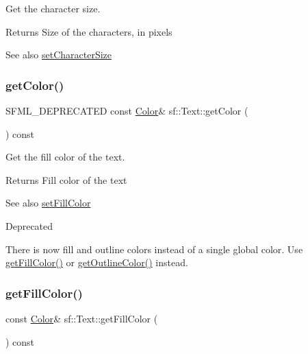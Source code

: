 Get the character size. 

\begin{DoxyReturn}{Returns}
Size of the characters, in pixels
\end{DoxyReturn}
\begin{DoxySeeAlso}{See also}
\hyperlink{classsf_1_1_text_ae96f835fc1bff858f8a23c5b01eaaf7e}{set\+Character\+Size} 
\end{DoxySeeAlso}
\mbox{\label{classsf_1_1_text_a77ba664285efd72ab4ce85b9cbbeeb21}} 
\subsubsection{\texorpdfstring{get\+Color()}{getColor()}}
{\footnotesize\ttfamily S\+F\+M\+L\+\_\+\+D\+E\+P\+R\+E\+C\+A\+T\+ED const \hyperlink{classsf_1_1_color}{Color}\& sf\+::\+Text\+::get\+Color (\begin{DoxyParamCaption}{ }\end{DoxyParamCaption}) const}



Get the fill color of the text. 

\begin{DoxyReturn}{Returns}
Fill color of the text
\end{DoxyReturn}
\begin{DoxySeeAlso}{See also}
\hyperlink{classsf_1_1_text_ab7bb3babac5a6da1802b2c3e1a3e6dcc}{set\+Fill\+Color}
\end{DoxySeeAlso}
\begin{DoxyRefDesc}{Deprecated}
\item[\hyperlink{deprecated__deprecated000016}{Deprecated}]There is now fill and outline colors instead of a single global color. Use \hyperlink{classsf_1_1_text_a6b4ba8c435b59e1e05f831e6230dc537}{get\+Fill\+Color()} or \hyperlink{classsf_1_1_text_a53559d563461089f1172571b375442dc}{get\+Outline\+Color()} instead.\end{DoxyRefDesc}
\mbox{\label{classsf_1_1_text_a6b4ba8c435b59e1e05f831e6230dc537}} 
\subsubsection{\texorpdfstring{get\+Fill\+Color()}{getFillColor()}}
{\footnotesize\ttfamily const \hyperlink{classsf_1_1_color}{Color}\& sf\+::\+Text\+::get\+Fill\+Color (\begin{DoxyParamCaption}{ }\end{DoxyParamCaption}) const}




